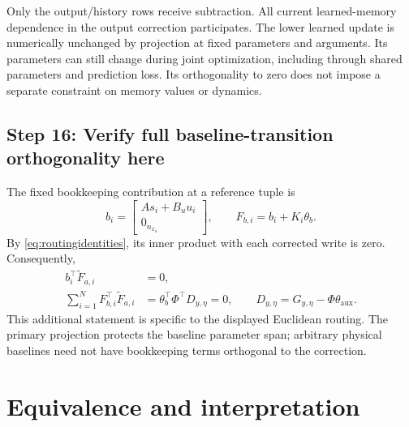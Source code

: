 \documentclass[11pt,a4paper]{article}
\begin{document}
Only the output/history rows receive subtraction. All current learned-memory dependence in the output correction participates. The lower learned update is numerically unchanged by projection at fixed parameters and arguments. Its parameters can still change during joint optimization, including through shared parameters and prediction loss. Its orthogonality to zero does not impose a separate constraint on memory values or dynamics.

\subsection*{Step 16: Verify full baseline-transition orthogonality here}
The fixed bookkeeping contribution at a reference tuple is
\begin{equation}\label{eq:bookkeeping}
b_i=\begin{bmatrix}As_i+B_u u_i\\0_{n_{x_a}}\end{bmatrix},\qquad F_{b,i}=b_i+K_i\theta_b.
\end{equation}
By \eqref{eq:routingidentities}, its inner product with each corrected write is zero. Consequently,
\begin{equation}\label{eq:fullbaseline}
\begin{aligned}
b_i^\top\widetilde F_{a,i}&=0,\\
\boxed{\sum_{i=1}^N F_{b,i}^\top\widetilde F_{a,i}}
&=\theta_b^\top\Phi^\top D_{y,\eta}=\boxed{0},\qquad
D_{y,\eta}=G_{y,\eta}-\Phi \theta_{\mathrm{aux}}.
\end{aligned}
\end{equation}
This additional statement is specific to the displayed Euclidean routing. The primary projection protects the baseline parameter span; arbitrary physical baselines need not have bookkeeping terms orthogonal to the correction.

\section{Equivalence and interpretation}
\end{document}
